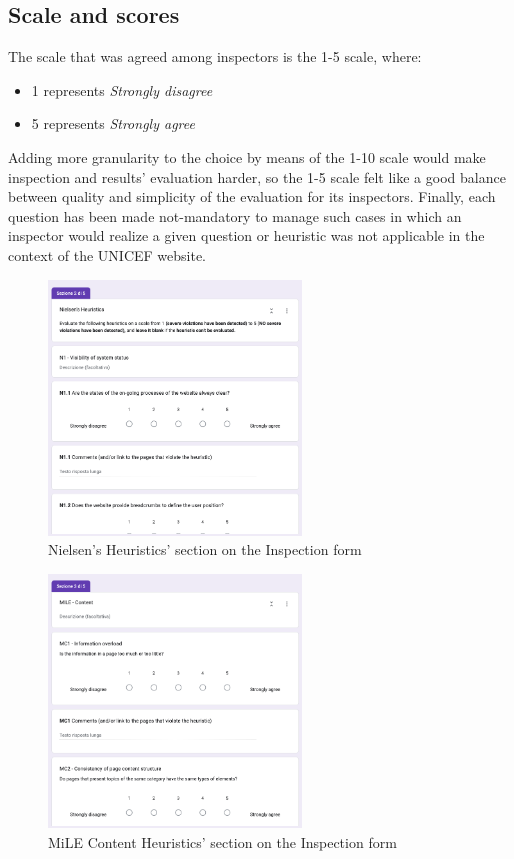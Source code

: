 \subsection{Scale and scores}
The scale that was agreed among inspectors is the 1-5 scale, where:
\begin{itemize}
	\item 1 represents \textit{Strongly disagree}
	\item 5 represents \textit{Strongly agree}
\end{itemize}
Adding more granularity to the choice by means of the 1-10 scale would make inspection and results' evaluation harder, so the 1-5 scale felt like a good balance between quality and simplicity of the evaluation for its inspectors.
Finally, each question has been made not-mandatory to manage such cases in which an inspector would realize a given question or heuristic was not applicable in the context of the UNICEF website.

\begin{figure}[h]
	\centering
	\includegraphics[width=0.6\textwidth]{img/nielsen_heuristics_form.png}
	\caption{Nielsen's Heuristics' section on the Inspection form}
	\label{fig:nielsenForm}
\end{figure}

\begin{figure}[h]
	\centering
	\includegraphics[width=0.6\textwidth]{img/mile_content_form.png}
	\caption{MiLE Content Heuristics' section on the Inspection form}
	\label{fig:mileForm}
\end{figure}

